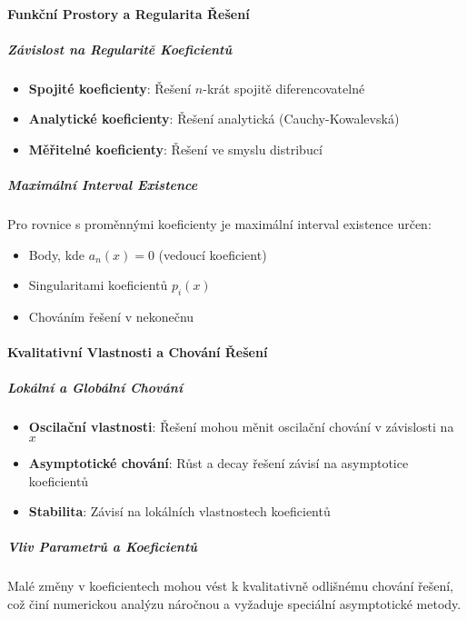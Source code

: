 \paragraph*{Funkční Prostory a Regularita Řešení}

\subparagraph*{Závislost na Regularitě Koeficientů}
\begin{itemize}
\item \textbf{Spojité koeficienty}: Řešení $n$-krát spojitě diferencovatelné
\item \textbf{Analytické koeficienty}: Řešení analytická (Cauchy-Kowalevská)
\item \textbf{Měřitelné koeficienty}: Řešení ve smyslu distribucí
\end{itemize}

\subparagraph*{Maximální Interval Existence}
Pro rovnice s proměnnými koeficienty je maximální interval existence určen:
\begin{itemize}
\item Body, kde $a_n(x) = 0$ (vedoucí koeficient)
\item Singularitami koeficientů $p_i(x)$
\item Chováním řešení v nekonečnu
\end{itemize}

\paragraph*{Kvalitativní Vlastnosti a Chování Řešení}

\subparagraph*{Lokální a Globální Chování}
\begin{itemize}
\item \textbf{Oscilační vlastnosti}: Řešení mohou měnit oscilační chování v závislosti na $x$
\item \textbf{Asymptotické chování}: Růst a decay řešení závisí na asymptotice koeficientů
\item \textbf{Stabilita}: Závisí na lokálních vlastnostech koeficientů
\end{itemize}

\subparagraph*{Vliv Parametrů a Koeficientů}
Malé změny v koeficientech mohou vést k kvalitativně odlišnému chování řešení, což činí numerickou analýzu náročnou a vyžaduje speciální asymptotické metody.

